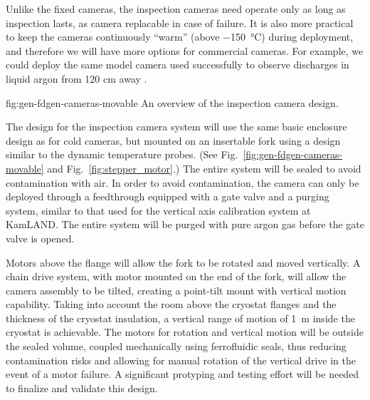 Unlike the fixed cameras, the inspection cameras need operate only as
long as inspection lasts, as camera replacable in case of failure.  It
is also more practical to keep the cameras continuously ``warm''
(above \SI{-150}{\celsius}) during deployment, and therefore we will
have more options for commercial cameras.  For example, we could
deploy the same model camera used successfully to observe discharges
in liquid argon from 120 cm away \cite{Auger:2015xlo}.

\begin{dunefigure}{fig:gen-fdgen-cameras-movable}
  {An overview of the inspection camera design.}
\end{dunefigure}

The design for the inspection camera system will use the same basic
enclosure design as for cold cameras, but mounted on an insertable
fork using a design similar to the dynamic temperature probes. (See
Fig.\ \ref{fig:gen-fdgen-cameras-movable} and
Fig.\ \ref{fig:stepper_motor}.)  The entire system will be sealed to
avoid contamination with air. In order to avoid contamination, the
camera can only be deployed through a feedthrough equipped with a gate
valve and a purging system, similar to that used for the vertical axis
calibration system at KamLAND\cite{Banksy:2014hra}. The entire system
will be purged with pure argon gas before the gate valve is opened.

Motors above the flange will allow the fork to be
rotated and moved vertically.  A chain drive system, with motor
mounted on the end of the fork, will allow the camera assembly to be
tilted, creating a point-tilt mount with vertical motion capability.
Taking into account the room above the cryostat flanges and the
thickness of the cryostat insulation, a vertical range of motion of
\SI{1}{m} inside the cryostat is achievable.
The motors for rotation and vertical motion will be outside the sealed
volume, coupled mechanically using ferrofluidic seals, thus reducing
contamination risks and allowing for manual rotation of the vertical
drive in the event of a motor failure.  A significant protyping and
testing effort will be needed to finalize and validate this design.

